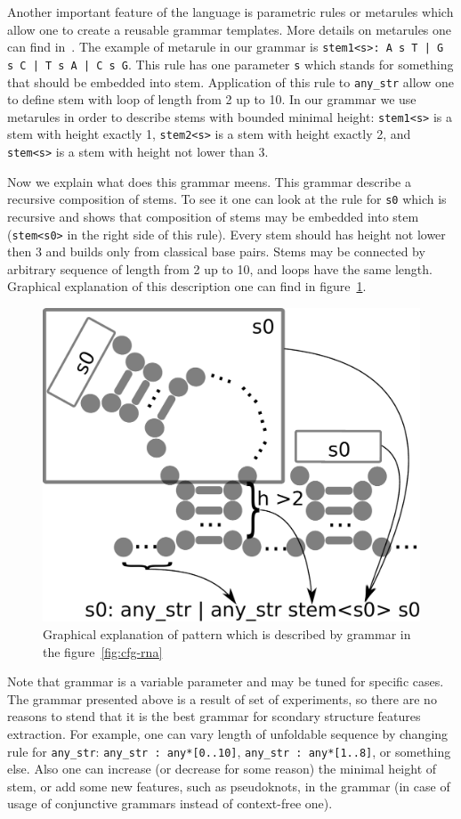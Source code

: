 \documentclass[a4paper,twoside]{article}
\begin{document}
Another important feature of the language is parametric rules or metarules which allow one to create a reusable grammar templates.
More details on metarules one can find in~\cite{!!!}.
The example of metarule in our grammar is \texttt{stem1<s>: A s T | G s C | T s A | C s G}.
This rule has one parameter \verb|s| which stands for something that should be embedded into stem.
Application of this rule to \verb|any_str| allow one to define stem with loop of length from 2 up to 10.
In our grammar we use metarules in order to describe stems with bounded minimal height: \verb|stem1<s>| is a stem with height exactly 1,  \verb|stem2<s>| is a stem with height exactly 2, and \verb|stem<s>| is a stem with height not lower than 3.

Now we explain what does this grammar meens.
This grammar describe a recursive composition of stems.
To see it one can look at the rule for \verb|s0| which is recursive and shows that composition of stems may be embedded into stem (\verb |stem<s0>| in the right side of this rule).
Every stem should has height not lower then 3 and builds only from classical base pairs.
Stems may be connected by arbitrary sequence of length from 2 up to 10, and loops have the same length.
Graphical explanation of this description one can find in figure~\ref{fig:cfg-rna-graphical}.

\begin{figure}
\centering
\includegraphics[width=.45\textwidth]{figures/16sgrammar.pdf}
\caption{Graphical explanation of pattern which is described by grammar in the figure~\ref{fig:cfg-rna}}
\label{fig:cfg-rna-graphical}
\end{figure}

Note that grammar is a variable parameter and may be tuned for specific cases.
The grammar presented above is a result of set of experiments, so there are no reasons to stend that it is the best grammar for scondary structure features extraction.
For example, one can vary length of unfoldable sequence by changing rule for \verb|any_str|: \verb|any_str : any*[0..10]|, \verb|any_str : any*[1..8]|, or something else.
Also one can increase (or decrease for some reason) the minimal height of stem, or add some new features, such as pseudoknots, in the grammar (in case of usage of conjunctive grammars instead of context-free one).
\end{document}
